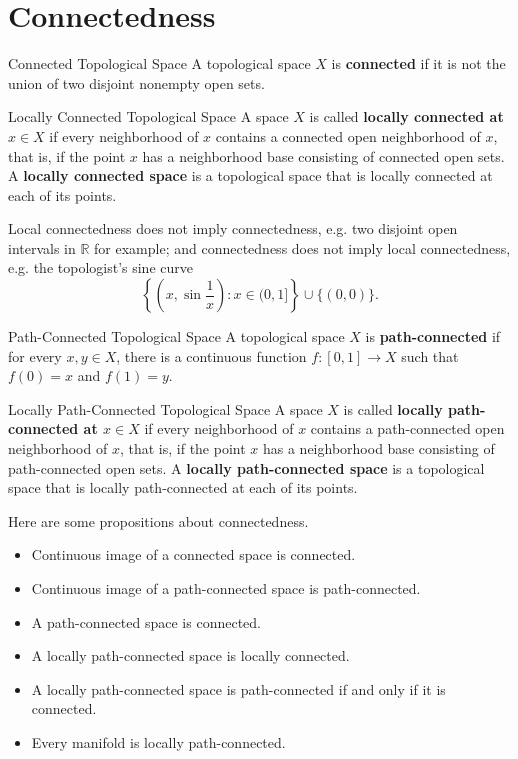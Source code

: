 \documentclass{report}
\begin{document}
\section{Connectedness}
\begin{definition}{Connected Topological Space}{}
	A topological space $X$ is \textbf{connected} if it is not the union of two disjoint nonempty open sets.
\end{definition}

\begin{definition}{Locally Connected Topological Space}{}
	A space $X$ is called \textbf{locally connected at $x\in X$} if every neighborhood of $x$ contains a connected open neighborhood of $x$, that is, if the point $x$ has a neighborhood base consisting of connected open sets. A \textbf{locally connected space} is a topological space that is locally connected at each of its points.
\end{definition}

Local connectedness does not imply connectedness, e.g. two disjoint open intervals in $\mathbb {R}$ for example; and connectedness does not imply local connectedness, e.g. the topologist's sine curve $$\left\{\left(x, \sin \frac{1}{x}\right): x \in(0,1]\right\} \cup\{(0,0)\}.$$
\begin{definition}{Path-Connected Topological Space}{}
	A topological space $X$ is \textbf{path-connected} if for every $x,y\in X$, there is a continuous function $f:[0,1]\to X$ such that $f(0)=x$ and $f(1)=y$.
\end{definition}

\begin{definition}{Locally Path-Connected Topological Space}{}
	A space $X$ is called \textbf{locally path-connected at $x\in X$} if every neighborhood of $x$ contains a path-connected open neighborhood of $x$, that is, if the point $x$ has a neighborhood base consisting of path-connected open sets. A \textbf{locally path-connected space} is a topological space that is locally path-connected at each of its points.
\end{definition}


\begin{proposition}{}{}
	Here are some propositions about connectedness.
	\begin{itemize}
		\item Continuous image of a connected space is connected.
		\item Continuous image of a path-connected space is path-connected.
		\item A path-connected space is connected.
		\item A locally path-connected space is locally connected.
		\item A locally path-connected space is path-connected if and only if it is connected.
		\item Every manifold is locally path-connected.
	\end{itemize}

\end{proposition}
\end{document}
